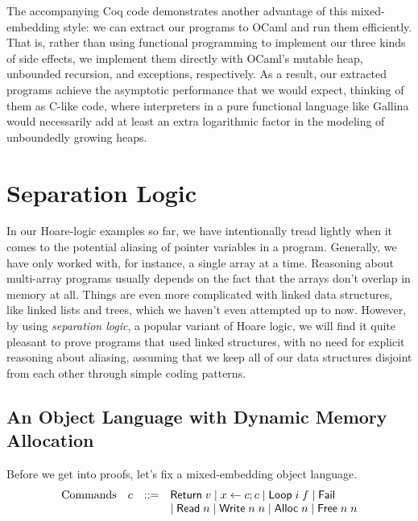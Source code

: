 \documentclass{amsbook}
\theoremstyle{definition}
\theoremstyle{remark}
\numberwithin{section}{chapter}
\numberwithin{equation}{chapter}
\begin{document}
The accompanying Coq code demonstrates another advantage of this mixed-embedding style: we can extract our programs to OCaml and run them efficiently.
That is, rather than using functional programming to implement our three kinds of side effects, we implement them directly with OCaml's mutable heap, unbounded recursion, and exceptions, respectively.
As a result, our extracted programs achieve the asymptotic performance that we would expect, thinking of them as C-like code, where interpreters in a pure functional language like Gallina would necessarily add at least an extra logarithmic factor in the modeling of unboundedly growing heaps.



\chapter{Separation Logic}

In our Hoare-logic examples so far, we have intentionally tread lightly when it comes to the potential aliasing of pointer variables in a program.
Generally, we have only worked with, for instance, a single array at a time.
Reasoning about multi-array programs usually depends on the fact that the arrays don't overlap in memory at all.
Things are even more complicated with linked data structures, like linked lists and trees, which we haven't even attempted up to now.
However, by using \emph{separation logic}, a popular variant of Hoare logic, we will find it quite pleasant to prove programs that used linked structures, with no need for explicit reasoning about aliasing, assuming that we keep all of our data structures disjoint from each other through simple coding patterns.


\section{An Object Language with Dynamic Memory Allocation}

Before we get into proofs, let's fix a mixed-embedding object language.
$$\begin{array}{rrcl}
  \textrm{Commands} & c &::=& \mathsf{Return} \; v \mid x \leftarrow c; c \mid \mathsf{Loop} \; i \; f \mid \mathsf{Fail} \\
  &&& \mid \mathsf{Read} \; n \mid \mathsf{Write} \; n \; n \mid \mathsf{Alloc} \; n \mid \mathsf{Free} \; n \; n
\end{array}$$
\end{document}
